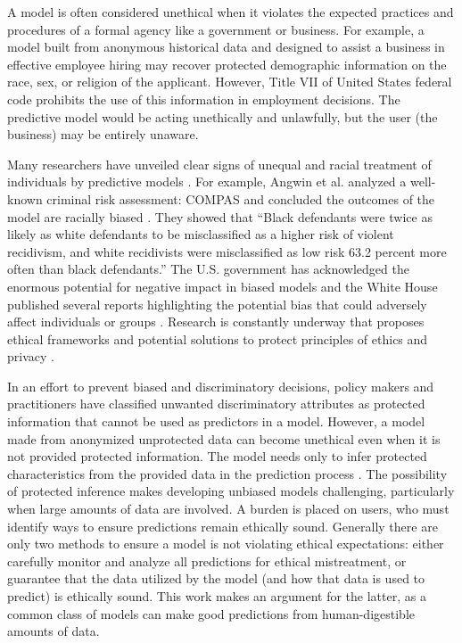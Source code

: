 \documentclass[conference]{IEEEtran}
\begin{document}
A model is often considered unethical when it violates the expected practices and procedures of a formal agency like a government or business. For example, a model built from anonymous historical data and designed to assist a business in effective employee hiring may recover protected demographic information on the race, sex, or religion of the applicant. However, Title VII of United States federal code prohibits the use of this information in employment decisions. The predictive model would be acting unethically and unlawfully, but the user (the business) may be entirely unaware.

Many researchers have unveiled clear signs of unequal and racial treatment of individuals by predictive models \cite{squires2003racial,stoll2004black,angwinmachine}.  For example, Angwin et al. analyzed a well-known criminal risk assessment: COMPAS and concluded the outcomes of the model are racially biased \cite{angwinmachine}. They showed that ``Black defendants were twice as likely as white defendants to be misclassified as a higher risk of violent recidivism, and white recidivists were misclassified as low risk 63.2 percent more often than black defendants.'' The U.S. government has acknowledged the enormous potential for negative impact in biased models and the White House published several reports highlighting the potential bias that could adversely affect individuals or groups \cite{smith2016big}. Research is constantly underway that proposes ethical frameworks and potential solutions to protect principles of ethics and privacy \cite{dedeo2014wrong,vayena2016elements,kass2001ethics}.

In an effort to prevent biased and discriminatory decisions, policy makers and practitioners have classified unwanted discriminatory attributes as protected information that cannot be used as predictors in a model. However, a model made from anonymized unprotected data can become unethical even when it is not provided protected information. The model needs only to infer protected characteristics from the provided data in the prediction process \cite{dedeo2014wrong,pedreshi2008discrimination}. The possibility of protected inference makes developing unbiased models challenging, particularly when large amounts of data are involved. A burden is placed on users, who must identify ways to ensure predictions remain ethically sound. Generally there are only two methods to ensure a model is not violating ethical expectations: either carefully monitor and analyze all predictions for ethical mistreatment, or guarantee that the data utilized by the model (and how that data is used to predict) is ethically sound. This work makes an argument for the latter, as a common class of models can make good predictions from human-digestible amounts of data.
\end{document}
